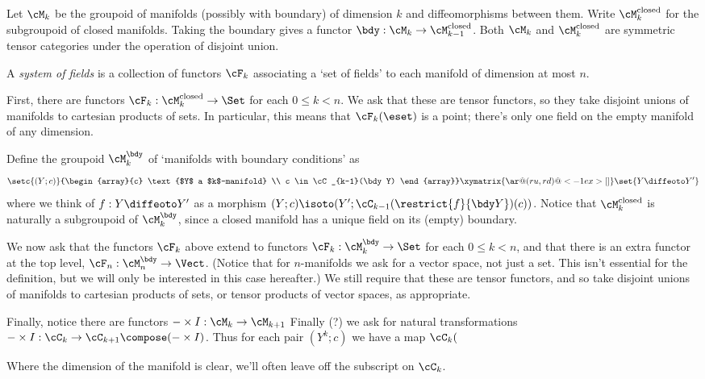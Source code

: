 
\newcommand{\manifolds}[1]{\cM_{#1}}
\newcommand{\closedManifolds}[1]{\cM_{#1}^{\text{closed}}}
\newcommand{\boundaryConditions}[1]{\cM_{#1}^{\bdy}}
Let $\manifolds{k}$ be the groupoid of manifolds (possibly with boundary) of dimension $k$ and diffeomorphisms between them. Write
$\closedManifolds{k}$ for the subgroupoid of closed manifolds. Taking the boundary gives a functor $\bdy : \manifolds{k} \to \closedManifolds{k-1}$.
Both $\manifolds{k}$ and $\closedManifolds{k}$ are symmetric tensor categories under the operation of disjoint union.
\begin{defn}
A \emph{system of fields} is a collection of functors $\cF_k$ associating a `set of fields' to each manifold of dimension at most $n$.

First, there are functors $\cF_k : \closedManifolds{k} \to \Set$ for each $0 \leq k < n$. We ask that these are tensor functors, so they
take disjoint unions of manifolds to cartesian products of sets. In particular, this means that $\cF_k(\eset)$ is a point; there's only one field
on the empty manifold of any dimension.

Define the groupoid $\boundaryConditions{k}$ of `manifolds with boundary conditions' as
\begin{equation*}
\setc{(Y; c)}{\begin{array}{c} \text{$Y$ a $k$-manifold} \\  c \in \cC_{k-1}(\bdy Y) \end{array}}
\xymatrix{ \ar@(ru,rd)@<-1ex>[]}
\set{Y \diffeoto Y'}
\end{equation*}
where we think of $f: Y \diffeoto Y'$ as a morphism $(Y; c) \isoto (Y'; \cC_{k-1}(\restrict{f}{\bdy Y})(c))$.
%
Notice that $\closedManifolds{k}$ is naturally a subgroupoid of $\boundaryConditions{k}$, since a closed manifold has a unique field on its (empty) boundary.

We now ask that the functors $\cF_k$ above extend to functors $\cF_k : \boundaryConditions{k} \to \Set$ for  each $0 \leq k < n$,
and that there is an extra functor at the top level, $\cF_n : \boundaryConditions{n} \to \Vect$. (Notice that for $n$-manifolds we ask for a vector space, not just a set. This isn't essential for the definition, but we will only be interested in this case hereafter.)
We still require that these are tensor functors, and so take disjoint unions of manifolds to cartesian products of sets, or tensor products of vector spaces, as appropriate.

Finally, notice there are functors $- \times I : \manifolds{k} \to \manifolds{k+1}$
Finally (?) we ask for natural transformations $- \times I : \cC_k \to \cC_{k+1} \compose (- \times I)$. Thus for each pair $(Y^k; c)$ we have a map $\cC_k($
\end{defn}
\begin{rem}
Where the dimension of the manifold is clear, we'll often leave off the subscript on $\cC_k$.
\end{rem}

